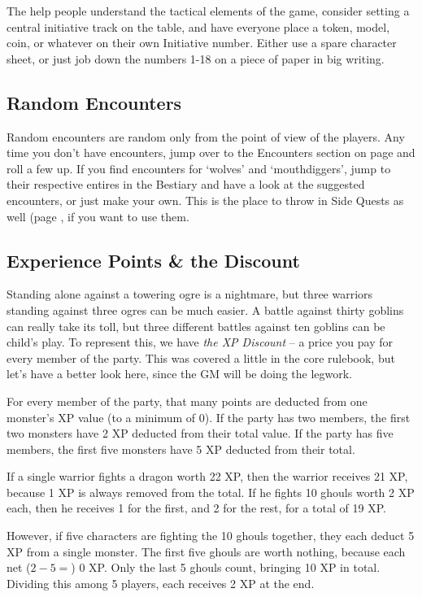 The help people understand the tactical elements of the game, consider setting a central initiative track on the table, and have everyone place a token, model, coin, or whatever on their own Initiative number.  Either use a spare character sheet, or just job down the numbers 1-18 on a piece of paper in big writing.

\subsection{Random Encounters}

Random encounters are random only from the point of view of the players.  Any time you don't have encounters, jump over to the Encounters section on page \pageref{encounters} and roll a few up.  If you find encounters for `wolves' and `mouthdiggers', jump to their respective entires in the Bestiary and have a look at the suggested encounters, or just make your own.  This is the place to throw in Side Quests as well (page \pageref{sidequests}, if you want to use them.

\subsection{Experience Points \& the Discount}

Standing alone against a towering ogre is a nightmare, but three warriors standing against three ogres can be much easier.  A battle against thirty goblins can really take its toll, but three different battles against ten goblins can be child's play.  To represent this, we have \textit{the XP Discount} -- a price you pay for every member of the party.  This was covered a little in the core rulebook, but let's have a better look here, since the GM will be doing the legwork.

For every member of the party, that many points are deducted from one monster's XP value (to a minimum of 0).  If the party has two members, the first two monsters have 2 XP deducted from their total value.  If the party has five members, the first five monsters have 5 XP deducted from their total.

If a single warrior fights a dragon worth 22 XP, then the warrior receives 21 XP, because 1 XP is always removed from the total.  If he fights 10 ghouls worth 2 XP each, then he receives 1 for the first, and 2 for the rest, for a total of 19 XP.

However, if five characters are fighting the 10 ghouls together, they each deduct 5 XP from a single monster.
The first five ghouls are worth nothing, because each net ($2 - 5 = $) 0 XP.  Only the last 5 ghouls count, bringing 10 XP in total.  Dividing this among 5 players, each receives 2 XP at the end.

